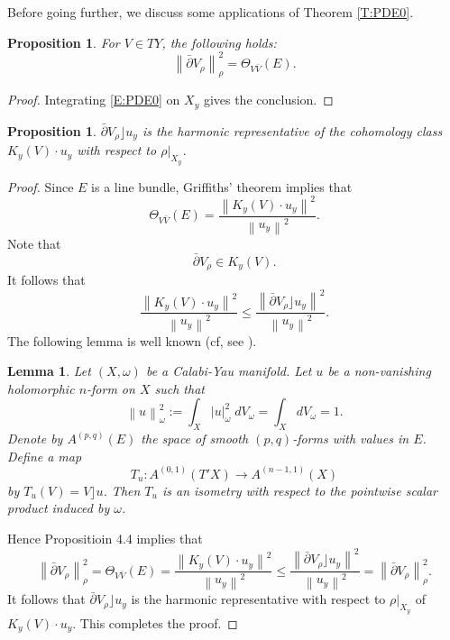 \documentclass{amsart}
\newtheorem{lemma}[theorem]{Lemma}
\newtheorem{proposition}[theorem]{Proposition}
\theoremstyle{definition}
\numberwithin{equation}{section}
\begin{document}
Before going further, we discuss some applications of Theorem \ref{T:PDE0}.

\begin{proposition} \label{P:norm_dbarv}
For $V\in TY$, the following holds:
\begin{equation*}
{\left\|{\bar\partial V_\rho}\right\|}_\rho^2
=
\Theta_{V\bar V}(E).
\end{equation*}
\end{proposition}
\begin{proof}
Integrating \eqref{E:PDE0} on $X_y$ gives the conclusion. 
\end{proof}

\begin{proposition}
$\bar\partial V_\rho\rfloor u_y$ is the harmonic representative of the cohomology class $K_y(V)\cdot u_y$ with respect to $\rho\vert_{X_y}$.
\end{proposition}

\begin{proof}
Since $E$ is a line bundle, Griffiths' theorem implies that
\begin{equation*}
\Theta_{V\bar V}(E)
=
\frac{{\left\|{K_y(V)\cdot u_y}\right\|}^2}{{\left\|{u_y}\right\|}^2}.
\end{equation*}
Note that
\begin{equation*}
\bar\partial V_\rho
\in
K_y(V).
\end{equation*}
It follows that
\begin{equation*}
\frac{{\left\|{K_y(V)\cdot u_y}\right\|}^2}{{\left\|{u_y}\right\|}^2}
\le
\frac{{\left\|{\bar\partial V_\rho\rfloor u_y}\right\|}^2}{{\left\|{u_y}\right\|}^2}.
\end{equation*}
The following lemma is well known (cf, see \cite{Popovici}).
\begin{lemma}
Let $(X,\omega)$ be a Calabi-Yau manifold. Let $u$ be a non-vanishing holomorphic $n$-form on $X$ such that 
\begin{equation*}
{\left\|{u}\right\|}^2_\omega
:=\int_X {\left\vert{u}\right\vert}^2_\omega\;dV_\omega
=\int_X dV_\omega
=1.
\end{equation*}
Denote by $A^{(p,q)}(E)$ the space of smooth $(p,q)$-forms with values in $E$. Define a map 
$$
T_u:A^{(0,1)}(T'X)\rightarrow A^{(n-1,1)}(X)
$$
by $T_u(V)=V\rfloor u$.
Then $T_u$ is an isometry with respect to the pointwise scalar product induced by $\omega$.
\end{lemma}
Hence Propositioin 4.4 implies that
\begin{equation*}
{\left\|{\bar\partial V_\rho}\right\|}_\rho^2
=
\Theta_{V\bar V}(E)
=
\frac{{\left\|{K_y(V)\cdot u_y}\right\|}^2}{{\left\|{u_y}\right\|}^2}
\le
\frac{{\left\|{\bar\partial V_\rho\rfloor u_y}\right\|}^2}{{\left\|{u_y}\right\|}^2}
=
{\left\|{\bar\partial V_\rho}\right\|}_\rho^2.
\end{equation*}
It follows that $\bar\partial V_\rho\rfloor u_y$ is the harmonic representative with respect to $\rho\vert_{X_y}$ of $K_y(V)\cdot u_y$. This completes the proof.
\end{proof}
\end{document}
